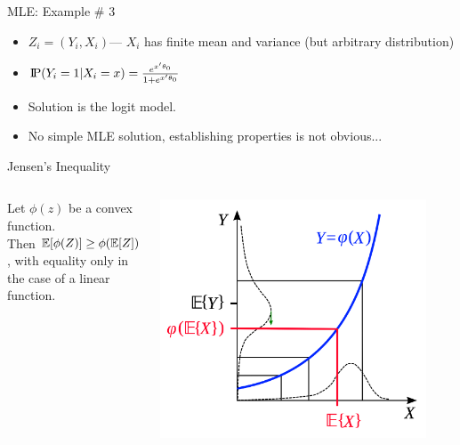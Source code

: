 \begin{frame}{MLE: Example \# 3}
\begin{itemize}
\item $Z_i = (Y_i, X_i)$---   $X_i$ has finite mean and variance (but arbitrary distribution)
\item $\text{I\kern-0.15em P}(Y_i=1 | X_i =x) =  \frac{e^{x' \theta_0}}{1+ e^{x'\theta_0}}$
\item Solution is the \alert{logit} model.
\item No simple MLE solution, establishing properties is not obvious...
\end{itemize}
\end{frame}

\begin{frame}{Jensen's Inequality}
\begin{columns}[T]
\begin{column}{.4\textwidth}
Let $\phi(z)$ be a convex function.\\ 
\vspace{2cm}
Then $\mathbb{E}[\phi(Z)] \geq \phi(\mathbb{E} [Z])$, with equality only in the case of a linear function.
\end{column}
\hfill
\begin{column}{.6\textwidth}
\begin{center}
 \includegraphics[width=0.9\textwidth]{resources/jensen.png}
\end{center}
\end{column}
\end{columns}



\end{frame}

